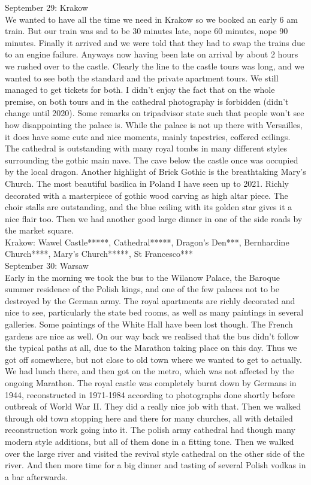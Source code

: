 September 29: Krakow\\
We wanted to have all the time we need in Krakow so we booked an early 6 am train. But our train was sad to be 30 minutes late, nope 60 minutes, nope 90 minutes. Finally it arrived and we were told that they had to swap the trains due to an engine failure. Anyways now having been late on arrival by about 2 hours we rushed over to the castle. Clearly the line to the castle tours was long, and we wanted to see both the standard and the private apartment tours. We still managed to get tickets for both. I didn't enjoy the fact that on the whole premise, on both tours and in the cathedral photography is forbidden (didn't change until 2020). Some remarks on tripadvisor state such that people won't see how disappointing the palace is. While the palace is not up there with Versailles, it does have some cute and nice moments, mainly tapestries, coffered ceilings. The cathedral is outstanding with many royal tombs in many different styles surrounding the gothic main nave. The cave below the castle once was occupied by the local dragon. Another highlight of Brick Gothic is the breathtaking Mary's Church. The most beautiful basilica in Poland I have seen up to 2021. Richly decorated with a masterpiece of gothic wood carving as high altar piece. The choir stalls are outstanding, and the blue ceiling with its golden star gives it a nice flair too. Then we had another good large dinner in one of the side roads by the market square.\\

Krakow: Wawel Castle*****, Cathedral*****, Dragon's Den***, Bernhardine Church****, Mary's Church*****, St Francesco***\\

September 30: Warsaw\\
Early in the morning we took the bus to the Wilanow Palace, the Baroque summer residence of the Polish kings, and one of the few palaces not to be destroyed by the German army. The royal apartments are richly decorated and nice to see, particularly the state bed rooms, as well as many paintings in several galleries. Some paintings of the White Hall have been lost though. The French gardens are nice as well. On our way back we realised that the bus didn't follow the typical paths at all, due to the Marathon taking place on this day. Thus we got off somewhere, but not close to old town where we wanted to get to actually. We had lunch there, and then got on the metro, which was not affected by the ongoing Marathon. The royal castle was completely burnt down by Germans in 1944, reconstructed in 1971-1984 according to photographs done shortly before outbreak of World War II. They did a really nice job with that. Then we walked through old town stopping here and there for many churches, all with detailed reconstruction work going into it. The polish army cathedral had though many modern style additions, but all of them done in a fitting tone. Then we walked over the large river and visited the revival style cathedral on the other side of the river. And then more time for a big dinner and tasting of several Polish vodkas in a bar afterwards.\\ 

